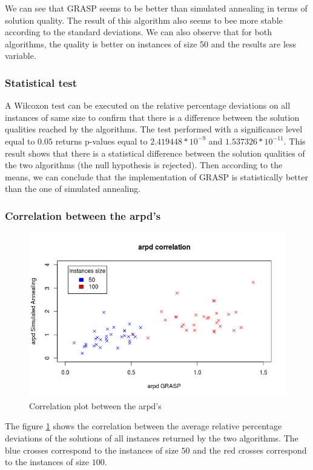 \documentclass{article}
\begin{document}
We can see that GRASP seems to be better than simulated annealing in terms of solution quality.
The result of this algorithm also seems to bee more stable according to the standard deviations.
We can also observe that for both algorithms, the quality is better on instances of size 50 and the results are less variable.

\subsubsection{Statistical test}

A Wilcoxon test can be executed on the relative percentage deviations on all instances of same size to confirm that there is a difference between the solution qualities reached by the algorithms.
The test performed with a significance level equal to $0.05$ returns p-values equal to $2.419448*10^{-9}$ and $1.537326*10^{-11}$.
This result shows that there is a statistical difference between the solution qualities of the two algorithms (the null hypothesis is rejected).
Then according to the means, we can conclude that the implementation of GRASP is statistically better than the one of simulated annealing.

\subsubsection{Correlation between the arpd's}

\begin{figure}
    \centering
        \includegraphics[scale=0.5]{images/correlation}
    \caption{Correlation plot between the arpd's}
    \label{fig:corr}
\end{figure}

The figure \ref{fig:corr} shows the correlation between the average relative percentage deviations of the solutions of all instances returned by the two algorithms.
The blue crosses correspond to the instances of size $50$ and the red crosses correspond to the instances of size $100$.
\end{document}
